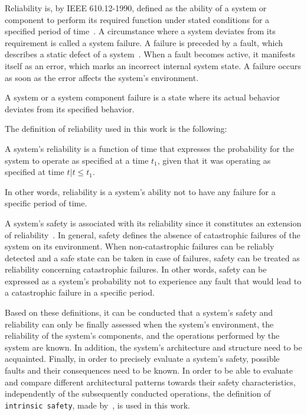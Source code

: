 Reliability is, by IEEE 610.12-1990, defined as the ability of a system or component to perform its required function under stated conditions for a specified period of time~\cite{ieee610.12}.
A circumstance where a system deviates from its requirement is called a system failure.
A failure is preceded by a fault, which describes a static defect of a system~\cite{AmmannOffutt2016}.
When a fault becomes active, it manifests itself as an error, which marks an incorrect internal system state.
A failure occurs as soon as the error affects the system's environment.

\begin{definition}
A system or a system component failure is a state where its actual behavior deviates from its specified behavior.
\end{definition}

The definition of reliability used in this work is the following:

\begin{definition}
\label{def:reliability}
A system's reliability is a function of time that expresses the probability for the system to operate as specified at a time $t_1$, given that it was operating as specified at time $t | t \leq t_1$.
\end{definition}

In other words, reliability is a system's ability not to have any failure for a specific period of time.

A system's safety is associated with its reliability since it constitutes an extension of reliability~\cite{AvizienisDependability2001}.
In general, safety defines the absence of catastrophic failures of the system on its environment.
When non-catastrophic failures can be reliably detected and a safe state can be taken in case of failures, safety can be treated as reliability concerning catastrophic failures.
In other words, safety can be expressed as a system's probability not to experience any fault that would lead to a catastrophic failure in a specific period.

Based on these definitions, it can be conducted that a system's safety and reliability can only be finally assessed when the system's environment, the reliability of the system's components, and the operations performed by the system are known.
In addition, the system's architecture and structure need to be acquainted.
Finally, in order to precisely evaluate a system's safety, possible faults and their consequences need to be known.
In order to be able to evaluate and compare different architectural patterns towards their safety characteristics, independently of the subsequently conducted operations, the definition of \texttt{intrinsic safety}, made by~\cite{BoulangerStandards}, is used in this work.

